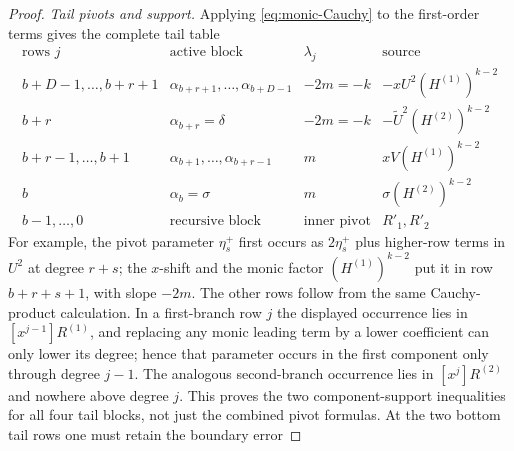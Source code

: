 \begin{proof}
      \smallskip\noindent\emph{Tail pivots and support.}
      Applying \eqref{eq:monic-Cauchy} to the first-order terms gives the complete tail
      table
      \[
      \begin{array}{c|c|c|c}
        \text{rows }j&\text{active block}&\lambda_j&\text{source}\\ \hline
        b+D-1,\ldots,b+r+1
          &\alpha_{b+r+1},\ldots,\alpha_{b+D-1}&-2m=-k&-xU^2(H^{(1)})^{k-2}\\
        b+r&\alpha_{b+r}=\delta&-2m=-k&-\widetilde U^2(H^{(2)})^{k-2}\\
        b+r-1,\ldots,b+1
          &\alpha_{b+1},\ldots,\alpha_{b+r-1}&m&xV(H^{(1)})^{k-2}\\
        b&\alpha_b=\sigma&m&\sigma(H^{(2)})^{k-2}\\
        b-1,\ldots,0&\text{recursive block}&\text{inner pivot}&R'_1,R'_2
      \end{array}
      \tag{R-even-table}
      \]
      For example, the pivot parameter $\eta^+_s$ first occurs as
      $2\eta^+_s$ plus higher-row terms in $U^2$ at degree $r+s$; the $x$-shift and the monic
      factor $(H^{(1)})^{k-2}$ put it in row $b+r+s+1$, with slope $-2m$.
      The other rows follow from the same Cauchy-product calculation.  In a
      first-branch row $j$ the displayed occurrence lies in
      $[x^{j-1}]R^{(1)}$, and replacing any monic leading term by a lower
      coefficient can only lower its degree; hence that parameter occurs in
      the first component only through degree $j-1$.  The analogous
      second-branch occurrence lies in $[x^j]R^{(2)}$ and nowhere above
      degree $j$.  This proves the two component-support inequalities for all
      four tail blocks, not just the combined pivot formulas.  At the
      two bottom tail rows one must retain the boundary error


\end{proof}
